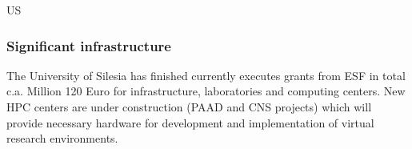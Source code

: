 \begin{sitedescription}{US}
\subsubsection*{Significant infrastructure}

The University of Silesia has finished currently executes grants from
ESF in total c.a. Million 120 Euro for infrastructure, laboratories and
computing centers. New HPC centers are under construction (PAAD and
CNS projects) which will provide necessary hardware for development
and implementation of virtual research environments.
\end{sitedescription}





